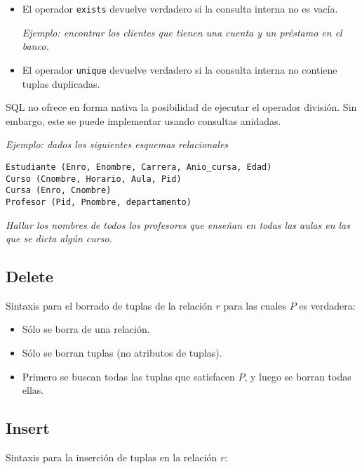 \documentclass[a4paper, twoside]{article}
\newcommand{\codedir}{../resources/code} %
\begin{document}
\begin{itemize}
	

	\item El operador \texttt{exists} devuelve verdadero si la consulta interna no es vacía.

	\emph{Ejemplo: encontrar los clientes que tienen una cuenta y un préstamo en el banco.}

	

	\item El operador \texttt{unique} devuelve verdadero si la consulta interna no contiene tuplas duplicadas.
\end{itemize}

SQL no ofrece en forma nativa la posibilidad de ejecutar el operador división. Sin embargo, este se puede implementar usando consultas anidadas.

\emph{Ejemplo: dados los siguientes esquemas relacionales}

\begin{lstlisting}
Estudiante (Enro, Enombre, Carrera, Anio_cursa, Edad)
Curso (Cnombre, Horario, Aula, Pid)
Cursa (Enro, Cnombre)
Profesor (Pid, Pnombre, departamento)
\end{lstlisting}

\emph{Hallar los nombres de todos los profesores que enseñan en todas las aulas en las que se dicta algún curso.}



\subsection{Delete}
Sintaxis para el borrado de tuplas de la relación $r$ para las cuales $P$ es verdadera:



\begin{itemize}
	\item Sólo se borra de una relación.
	\item Sólo se borran tuplas (no atributos de tuplas).
	\item Primero se buscan todas las tuplas que satisfacen $P$, y luego se borran todas ellas.
\end{itemize}

\subsection{Insert}
Sintaxis para la inserción de tuplas en la relación $r$:
\end{document}
